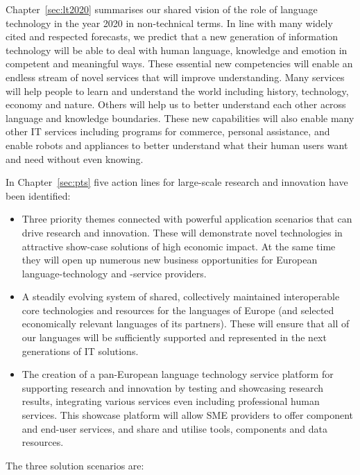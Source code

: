\documentclass[10pt, plain]{../../metanetpaper}
\begin{document}
\begin{multicols}{2}
Chapter~\ref{sec:lt2020} summarises our shared vision of the role of language technology in the year 2020 in non-technical terms. In line with many widely cited and respected forecasts, we predict that a new generation of information technology will be able to deal with human language, knowledge and emotion in competent and meaningful ways. These essential new competencies will enable an endless stream of novel services that will improve understanding. Many services will help people to learn and understand the world including history, technology, economy and nature. Others will help us to better understand each other across language and knowledge boundaries. These new capabilities will also enable many other IT services including programs for commerce, personal assistance, and enable robots and appliances to better understand what their human users want and need without even knowing. 

In Chapter~\ref{sec:pts} five action lines for large-scale research and innovation have been identified:

\begin{itemize}
\item Three priority themes connected with powerful application scenarios that can drive research and innovation. These will demonstrate novel technologies in attractive show-case solutions of high economic impact. At the same time they will open up numerous new business opportunities for European language-technology and -service providers.
\item A steadily evolving system of shared, collectively maintained interoperable core technologies and resources for the languages of Europe (and selected economically relevant languages of its partners). These will ensure that all of our languages will be sufficiently supported and represented in the next generations of IT solutions.
\item The creation of a pan-European language technology service platform for supporting research and innovation by testing and showcasing research results, integrating various services even including professional human services. This showcase platform will allow SME providers to offer component and end-user services, and share and utilise tools, components and data resources. 
\end{itemize}

\pagebreak
The three solution scenarios are:


\end{multicols}
\end{document}
